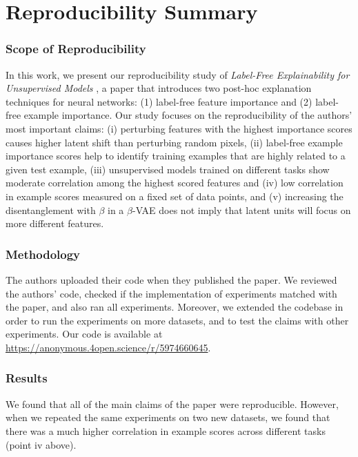 \section*{\centering Reproducibility Summary}

\subsubsection*{Scope of Reproducibility}


\vspace{1em}
In this work, we present our reproducibility study of \textit{Label-Free Explainability for Unsupervised Models} \cite{crabbe2022label}, a paper that introduces two post-hoc explanation techniques for neural networks: (1) label-free feature importance and (2) label-free example importance. Our study focuses on the reproducibility of the authors' most important claims: (i) perturbing features with the highest importance scores causes higher latent shift than perturbing random pixels, (ii) label-free example importance scores help to identify training examples that are highly related to a given test example, (iii) unsupervised models trained on different tasks show moderate correlation among the highest scored features and (iv) low correlation in example scores measured on a fixed set of data points, and (v) increasing the disentanglement with $\beta$ in a $\beta$-VAE \cite{Higgins2016betaVAELB} does not imply that latent units will focus on more different features.

\subsubsection*{Methodology}

The authors uploaded their code when they published the paper. We reviewed the authors' code, checked if the implementation of experiments matched with the paper, and also ran all experiments. Moreover, we extended the codebase in order to run the experiments on more datasets, and to test the claims with other experiments. Our code is available at \url{https://anonymous.4open.science/r/5974660645}. 

\subsubsection*{Results}

We found that all of the main claims of the paper were reproducible. However, when we repeated the same experiments on two new datasets, we found that there was a much higher correlation in example scores across different tasks (point iv above). 

